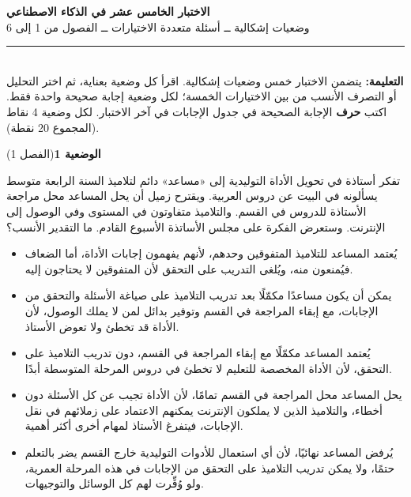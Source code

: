 \documentclass[11pt,a4paper]{article}
\begin{document}
\linespread{1.08}\selectfont
\begin{center}
{\LARGE\khatt\textbf{الاختبار الخامس عشر في الذكاء الاصطناعي}}\\[4pt]
{\normalsize وضعيات إشكالية ــ أسئلة متعددة الاختيارات ــ الفصول من 1 إلى 6}
\end{center}
\vspace{-2pt}\rule{\textwidth}{0.6pt}\\[2pt]
\textbf{التعليمة:} يتضمن الاختبار خمس وضعيات إشكالية. اقرأ كل وضعية بعناية، ثم اختر التحليل أو التصرف الأنسب
من بين الاختيارات الخمسة؛ لكل وضعية إجابة صحيحة واحدة فقط.
اكتب \textbf{حرف} الإجابة الصحيحة في جدول الإجابات في آخر الاختبار.
لكل وضعية 4 نقاط (المجموع 20 نقطة).
\vspace{4pt}

\noindent
{\large\khatt\textbf{الوضعية 1}}\hfill{\small(الفصل 1)}\par\nopagebreak\vspace{3pt}
\setlength{\fboxsep}{7pt}\colorbox{gray!10}{\parbox{\dimexpr\linewidth-14pt}{تفكر أستاذة في تحويل الأداة التوليدية إلى «مساعد» دائم لتلاميذ السنة الرابعة متوسط يسألونه في البيت عن دروس العربية. ويقترح زميل أن يحل المساعد محل مراجعة الأستاذة للدروس في القسم. والتلاميذ متفاوتون في المستوى وفي الوصول إلى الإنترنت. وستعرض الفكرة على مجلس الأساتذة الأسبوع القادم. ما التقدير الأنسب؟}}\par\nopagebreak
\begin{itemize}[leftmargin=1.0cm, labelsep=6pt, itemsep=3pt, topsep=4pt, parsep=0pt]
  \item[\textbf{أ)}] يُعتمد المساعد للتلاميذ المتفوقين وحدهم، لأنهم يفهمون إجابات الأداة، أما الضعاف فيُمنعون منه، ويُلغى التدريب على التحقق لأن المتفوقين لا يحتاجون إليه.
  \item[\textbf{ب)}] يمكن أن يكون مساعدًا مكمّلًا بعد تدريب التلاميذ على صياغة الأسئلة والتحقق من الإجابات، مع إبقاء المراجعة في القسم وتوفير بدائل لمن لا يملك الوصول، لأن الأداة قد تخطئ ولا تعوض الأستاذ.
  \item[\textbf{ج)}] يُعتمد المساعد مكمّلًا مع إبقاء المراجعة في القسم، دون تدريب التلاميذ على التحقق، لأن الأداة المخصصة للتعليم لا تخطئ في دروس المرحلة المتوسطة أبدًا.
  \item[\textbf{د)}] يحل المساعد محل المراجعة في القسم تمامًا، لأن الأداة تجيب عن كل الأسئلة دون أخطاء، والتلاميذ الذين لا يملكون الإنترنت يمكنهم الاعتماد على زملائهم في نقل الإجابات، فيتفرغ الأستاذ لمهام أخرى أكثر أهمية.
  \item[\textbf{هـ)}] يُرفض المساعد نهائيًا، لأن أي استعمال للأدوات التوليدية خارج القسم يضر بالتعلم حتمًا، ولا يمكن تدريب التلاميذ على التحقق من الإجابات في هذه المرحلة العمرية، ولو وُفِّرت لهم كل الوسائل والتوجيهات.
\end{itemize}
\end{document}

